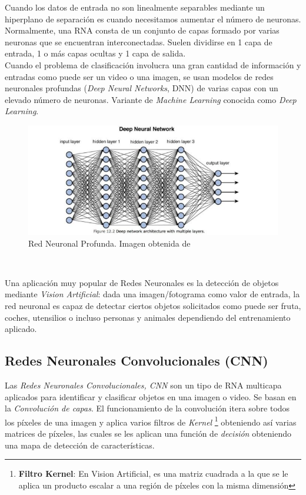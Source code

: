 Cuando los datos de entrada no son linealmente separables mediante un hiperplano de separación es cuando necesitamos aumentar el número de neuronas. Normalmente, una RNA consta de un conjunto de capas formado por varias neuronas que se encuentran interconectadas. Suelen dividirse en 1 capa de entrada, 1 o más capas ocultas y 1 capa de salida.\\

Cuando el problema de clasificación involucra una gran cantidad de información y entradas como puede ser un video o una imagen, se usan modelos de redes neuronales profundas (\textit{Deep Neural Networks}, DNN) de varias capas con un elevado número de neuronas. Variante de \textit{Machine Learning} conocida como \textit{Deep Learning}.\\

\begin{figure}[H]
  \begin{center}
    \includegraphics[width=15cm]{imagenes/cap1/dnn.jpeg}
  \end{center}
  \caption[Red Neuronal Profunda (DNN)]{Red Neuronal Profunda. Imagen obtenida de \cite{dnn}}
  \label{fig:salida_perceptron}
\end{figure}\

Una aplicación muy popular de Redes Neuronales es la detección de objetos mediante \textit{Vision Artificial}: dada una imagen/fotograma como valor de entrada, la red neuronal es capaz de detectar ciertos objetos solicitados como puede ser fruta, coches, utensilios o incluso personas y animales dependiendo del entrenamiento aplicado.\\


\subsection{Redes Neuronales Convolucionales (CNN)}
\label{subsec:redes_convolucionales}

Las \textit{Redes Neuronales Convolucionales, CNN} son un tipo de RNA multicapa aplicados para identificar y clasificar objetos en una imagen o video. Se basan en la \textit{Convolución de capas}. El funcionamiento de la convolución itera sobre todos los píxeles de una imagen y aplica varios filtros de \textit{Kernel} \footnote{\textbf{Filtro Kernel}: En Vision Artificial, es una matriz cuadrada a la que se le aplica un producto escalar a una región de píxeles con la misma dimensión} obteniendo así varias matrices de píxeles, las cuales se les aplican una función de \textit{decisión} obteniendo una mapa de detección de características.\\

